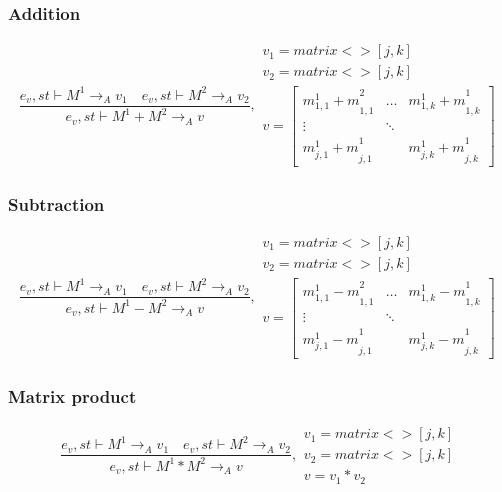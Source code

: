 \subsubsection{Addition}
\begin{equation}
	\frac { { e }_{ v },st\vdash { M }^{ 1 }{ \rightarrow  }_{ A }{ v }_{ 1 }\quad { e }_{ v },st\vdash { M }^{ 2 }{ \rightarrow  }_{ A }{ v }_{ 2 } }{ { e }_{ v },st\vdash { M }^{ 1 }+{ M }^{ 2 }{ \rightarrow  }_{ A }{ v } } ,\begin{matrix} { v }_{ 1 }=matrix<>[j,k] \\ { v }_{ 2 }=matrix<>[j,k] \\ v=\begin{bmatrix} { { m }_{ 1,1 }^{ 1 }+m }_{ 1,1 }^{ 2 } & \dots  & { { m }_{ 1,k }^{ 1 }+m }_{ 1,k }^{ 1 } \\ \vdots  & \ddots  &  \\ { { m }_{ j,1 }^{ 1 }+m }_{ j,1 }^{ 1 } &  & { { m }_{ j,k }^{ 1 }+m }_{ j,k }^{ 1 } \end{bmatrix} \end{matrix}
\end{equation}


\subsubsection{Subtraction}
\begin{equation}
	\frac { { e }_{ v },st\vdash { M }^{ 1 }{ \rightarrow  }_{ A }{ v }_{ 1 }\quad { e }_{ v },st\vdash { M }^{ 2 }{ \rightarrow  }_{ A }{ v }_{ 2 } }{ { e }_{ v },st\vdash { M }^{ 1 }-{ M }^{ 2 }{ \rightarrow  }_{ A }{ v } } ,\begin{matrix} { v }_{ 1 }=matrix<>[j,k] \\ { v }_{ 2 }=matrix<>[j,k] \\ v=\begin{bmatrix} { { m }_{ 1,1 }^{ 1 }-m }_{ 1,1 }^{ 2 } & \dots  & { { m }_{ 1,k }^{ 1 }-m }_{ 1,k }^{ 1 } \\ \vdots  & \ddots  &  \\ { { m }_{ j,1 }^{ 1 }-m }_{ j,1 }^{ 1 } &  & { { m }_{ j,k }^{ 1 }-m }_{ j,k }^{ 1 } \end{bmatrix} \end{matrix}
\end{equation}


\subsubsection{Matrix product}
\begin{equation}
	\frac { { e }_{ v },st\vdash { M }^{ 1 }{ \rightarrow  }_{ A }{ v }_{ 1 }\quad { e }_{ v },st\vdash { M }^{ 2 }{ \rightarrow  }_{ A }{ v }_{ 2 } }{ { e }_{ v },st\vdash { M }^{ 1 }*{ M }^{ 2 }{ \rightarrow  }_{ A }{ v } } ,\begin{matrix} { v }_{ 1 }=matrix<>[j,k] \\ { v }_{ 2 }=matrix<>[j,k] \\ v={ v }_{ 1 }*{ v }_{ 2 } \end{matrix}
\end{equation}

